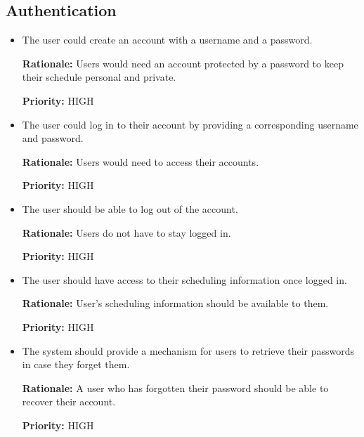 \documentclass[12pt]{article}
\newcounter{reqnum} %
\newcommand{\rthereqnum}{FR\refstepcounter{reqnum}\thereqnum:}
\begin{document}
\subsection{Authentication}
\begin{itemize}[leftmargin=16.5mm,labelsep=4mm,label=\rthereqnum]

\item
The user could create an account with a username and a password.

\textbf{Rationale:} Users would need an account protected by a password to keep their schedule personal and private.

\textbf{Priority:} HIGH
\item
The user could log in to their account by providing a corresponding username and password.

\textbf{Rationale:} Users would need to access their accounts.

\textbf{Priority:} HIGH
\item
The user should be able to log out of the account.

\textbf{Rationale:} Users do not have to stay logged in.

\textbf{Priority:} HIGH
\item
The user should have access to their scheduling information once logged in.

\textbf{Rationale:} User's scheduling information should be available to them.

\textbf{Priority:} HIGH

\item 
The system should provide a mechanism for users to retrieve their passwords in case they forget them.

\textbf{Rationale:} A user who has forgotten their password should be able to recover their account.

\textbf{Priority:} HIGH

\end{itemize}
\end{document}
